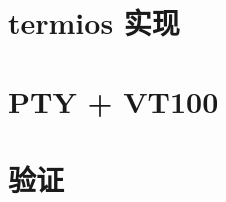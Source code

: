 
\section{termios 实现}
\label{sec:tty-termios}


\section{PTY + VT100}
\label{sec:tty-pty}


\section{验证}
\label{sec:tty-verify}

